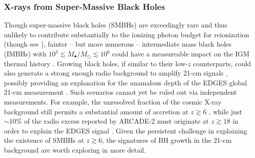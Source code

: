 
\subsubsection{X-rays from Super-Massive Black Holes} \label{sec:smbhs}
Though super-massive black holes (SMBHs) are exceedingly rare and thus unlikely to contribute substantially to the ionizing photon budget for reionization \cite{Hassan2018} (though see \cite{Madau2015}), fainter -- but more numerous -- intermediate mass black holes (IMBHs) with $10^3 \lesssim M_{\bullet} / M_{\odot} \lesssim 10^6$ could have a measureable impact on the IGM thermal history \cite{Zaroubi2007,Ripamonti2008,Tanaka2016}. Growing black holes, if similar to their low-$z$ counterparts, could also generate a strong enough radio background to amplify 21-cm signals \cite{EwallWice2018}, possibly providing an explanation for the anamalous depth of the EDGES global 21-cm measurement \cite{Bowman2018}. Such scenarios cannot yet be ruled out via independent measurements. For example, the unresolved fraction of the cosmic X-ray background still permits a substantial amount of accretion at $z \gtrsim 6$ \cite{McQuinn2012,Fialkov2017,Mirocha2018}, while just $\sim 10$\% of the radio excess reported by ARCADE-2 \cite{Fixsen2011,Singal2018} must originate at $z \gtrsim 18$ in order to explain the EDGES signal \cite{Feng2018}. Given the persistent challenge in explaining the existence of SMBHs at $z \gtrsim 6$, the signatures of BH growth in the 21-cm background are worth exploring in more detail.

